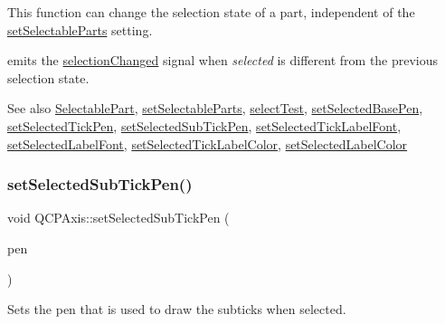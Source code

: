 This function can change the selection state of a part, independent of the \mbox{\hyperlink{class_q_c_p_axis_a513f9b9e326c505d9bec54880031b085}{set\+Selectable\+Parts}} setting.

emits the \mbox{\hyperlink{class_q_c_p_axis_a62b598abeee7174a05f9d542cc85b1f5}{selection\+Changed}} signal when {\itshape selected} is different from the previous selection state.

\begin{DoxySeeAlso}{See also}
\mbox{\hyperlink{class_q_c_p_axis_abee4c7a54c468b1385dfce2c898b115f}{Selectable\+Part}}, \mbox{\hyperlink{class_q_c_p_axis_a513f9b9e326c505d9bec54880031b085}{set\+Selectable\+Parts}}, \mbox{\hyperlink{class_q_c_p_axis_a48e4f1bafd1826ba2ad46b691205bb90}{select\+Test}}, \mbox{\hyperlink{class_q_c_p_axis_aeb917a909215605b95ef2be843de1ee8}{set\+Selected\+Base\+Pen}}, \mbox{\hyperlink{class_q_c_p_axis_a8360502685eb782edbf04019c9345cdc}{set\+Selected\+Tick\+Pen}}, \mbox{\hyperlink{class_q_c_p_axis_a2a00a7166600155eac26843132eb9576}{set\+Selected\+Sub\+Tick\+Pen}}, \mbox{\hyperlink{class_q_c_p_axis_a845ccb560b7bc5281098a5be494145f6}{set\+Selected\+Tick\+Label\+Font}}, \mbox{\hyperlink{class_q_c_p_axis_a02ec2a75d4d8401eaab834fbc6803d30}{set\+Selected\+Label\+Font}}, \mbox{\hyperlink{class_q_c_p_axis_a9bdbf5e63ab15187f3a1de9440129227}{set\+Selected\+Tick\+Label\+Color}}, \mbox{\hyperlink{class_q_c_p_axis_a5d502dec597c634f491fdd73d151c72d}{set\+Selected\+Label\+Color}} 
\end{DoxySeeAlso}
\mbox{\label{class_q_c_p_axis_a2a00a7166600155eac26843132eb9576}} 
\subsubsection{\texorpdfstring{set\+Selected\+Sub\+Tick\+Pen()}{setSelectedSubTickPen()}}
{\footnotesize\ttfamily void Q\+C\+P\+Axis\+::set\+Selected\+Sub\+Tick\+Pen (\begin{DoxyParamCaption}\item[{const Q\+Pen \&}]{pen }\end{DoxyParamCaption})}

Sets the pen that is used to draw the subticks when selected.

